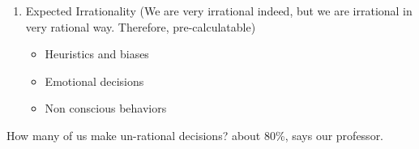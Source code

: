 \documentclass[12pt]{article}
\begin{document}
\begin{enumerate}
\begin{itemize}
	\end{itemize}
	\item Expected Irrationality (We are very irrational indeed, but we are irrational in very rational way. Therefore, pre-calculatable)
	\begin{itemize}
		\item Heuristics and biases
		\item  Emotional decisions
		\item Non conscious behaviors
	\end{itemize}
\end{enumerate}

How many of us make un-rational decisions? about 80\%, says our professor.
\end{document}
